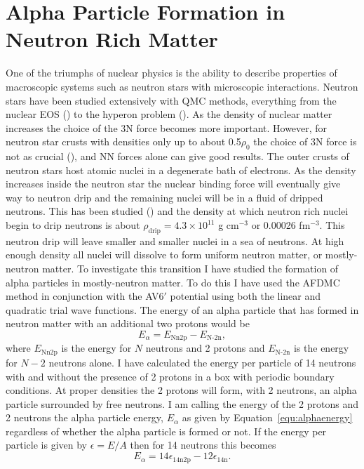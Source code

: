 \chapter{Alpha Particle Formation in Neutron Rich Matter}
One of the triumphs of nuclear physics is the ability to describe properties of macroscopic systems such as neutron stars with microscopic interactions. Neutron stars have been studied extensively with QMC methods, everything from the nuclear EOS (\cite{sarsa2003,gandolfi2014}) to the hyperon problem (\cite{lonardoni2015,gandolfi2018}). As the density of nuclear matter increases the choice of the 3N force becomes more important. However, for neutron star crusts with densities only up to about 0.5$\rho_0$ the choice of 3N force is not as crucial (\cite{gandolfi2009}), and NN forces alone can give good results. The outer crusts of neutron stars host atomic nuclei in a degenerate bath of electrons. As the density increases inside the neutron star the nuclear binding force will eventually give way to neutron drip and the remaining nuclei will be in a fluid of dripped neutrons. This has been studied (\cite{lorenz1993,chamel2015}) and the density at which neutron rich nuclei begin to drip neutrons is about $\rho_\text{drip} = 4.3\times10^{11}$ g cm$^{-3}$ or 0.00026 fm$^{-3}$. This neutron drip will leave smaller and smaller nuclei in a sea of neutrons. At high enough density all nuclei will dissolve to form uniform neutron matter, or mostly-neutron matter. To investigate this transition I have studied the formation of alpha particles in mostly-neutron matter. To do this I have used the AFDMC method in conjunction with the AV6$'$ potential using both the linear and quadratic trial wave functions. The energy of an alpha particle that has formed in neutron matter with an additional two protons would be
\begin{equation}
   E_\alpha = E_\text{Nn2p} - E_\text{N-2n},
   \label{equ:alphaenergy}
\end{equation}
where $E_\text{Nn2p}$ is the energy for $N$ neutrons and 2 protons and $E_\text{N-2n}$ is the energy for $N-2$ neutrons alone. I have calculated the energy per particle of 14 neutrons with and without the presence of 2 protons in a box with periodic boundary conditions. At proper densities the 2 protons will form, with 2 neutrons, an alpha particle surrounded by free neutrons. I am calling the energy of the 2 protons and 2 neutrons the alpha particle energy, $E_\alpha$ as given by Equation~\ref{equ:alphaenergy} regardless of whether the alpha particle is formed or not. If the energy per particle is given by $\epsilon = E/A$ then for 14 neutrons this becomes
\begin{equation}
   E_\alpha = 14\epsilon_\text{14n2p} - 12\epsilon_\text{14n}.
   \label{equ:alphaenergy14n2p}
\end{equation}

